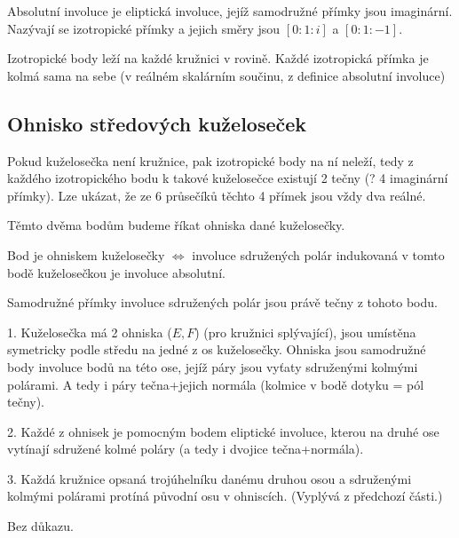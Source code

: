 \documentclass[12pt]{article}					%
\begin{document}
\begin{poznamka}[Platí]
	Absolutní involuce je eliptická involuce, jejíž samodružné přímky jsou imaginární. Nazývají se izotropické přímky a jejich směry jsou $[0:1:i]$ a $[0:1:-1]$.
\end{poznamka}

\begin{poznamka}
	Izotropické body leží na každé kružnici v rovině. Každé izotropická přímka je kolmá sama na sebe (v reálném skalárním součinu, z definice absolutní involuce)
\end{poznamka}

\subsection{Ohnisko středových kuželoseček}
\begin{dusledek}
	Pokud kuželosečka není kružnice, pak izotropické body na ní neleží, tedy z každého izotropického bodu k takové kuželosečce existují 2 tečny (? 4 imaginární přímky). Lze ukázat, že ze 6 průsečíků těchto 4 přímek jsou vždy dva reálné.
\end{dusledek}

\begin{definice}[Ohnisko]
	Těmto dvěma bodům budeme říkat ohniska dané kuželosečky.
\end{definice}

\begin{veta}
	Bod je ohniskem kuželosečky $\Leftrightarrow$ involuce sdružených polár indukovaná v tomto bodě kuželosečkou je involuce absolutní.

	\begin{dukazin}
		Samodružné přímky involuce sdružených polár jsou právě tečny z tohoto bodu.
	\end{dukazin}
\end{veta}

\begin{veta}
	1. Kuželosečka má 2 ohniska ($E, F$) (pro kružnici splývající), jsou umístěna symetricky podle středu na jedné z os kuželosečky. Ohniska jsou samodružné body involuce bodů na této ose, jejíž páry jsou vyťaty sdruženými kolmými polárami. A tedy i páry tečna+jejich normála (kolmice v bodě dotyku = pól tečny).

	2. Každé z ohnisek je pomocným bodem eliptické involuce, kterou na druhé ose vytínají sdružené kolmé poláry (a tedy i dvojice tečna+normála).

	3. Každá kružnice opsaná trojúhelníku danému druhou osou a sdruženými kolmými polárami protíná původní osu v ohniscích. (Vyplývá z předchozí části.)

	\begin{dukazin}
		Bez důkazu.
	\end{dukazin}
\end{veta}
\end{document}
